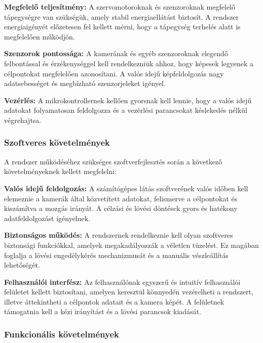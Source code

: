 \documentclass[12pt,a4paper]{article}
\begin{document}
\begin{list}{}{}
	\item \textbf{Megfelelő teljesítmény:}  A szervomotoroknak és szenzoroknak megfelelő tápegységre van szükségük, amely stabil energiaellátást biztosít. A rendszer energiaigényét előzetesen fel kellett mérni, hogy a tápegység terhelés alatt is megfelelően működjön.
	\item \textbf{Szenzorok pontossága:} A kamerának és egyéb szenzoroknak elegendő felbontással és érzékenységgel kell rendelkezniük ahhoz, hogy képesek legyenek a célpontokat megfelelően azonosítani. A valós idejű képfeldolgozás nagy adatsebességet és megbízható szenzorjeleket igényel.
	\item\textbf{ Vezérlés:} A mikrokontrollernek kellően gyorsnak kell lennie, hogy a valós idejű adatokat folyamatosan feldolgozza és a vezérlési parancsokat késlekedés nélkül végrehajtsa.
\end{list}


\subsubsection*{Szoftveres követelmények}

A rendszer működéséhez szükséges szoftverfejlesztés során a következő követelményeknek kellett megfelelni:

\begin{list}{}{}
	\item \textbf{Valós idejű feldolgozás:}  A számítógépes látás szoftverének valós időben kell elemeznie a kamerák által közvetített adatokat, felismerve a célpontokat és kiszámítva a mozgás irányát. A célzási és lövési döntések gyors és hatékony adatfeldolgozást igényelnek.
	\item \textbf{Biztonságos működés:} A rendszernek rendelkeznie kell olyan szoftveres biztonsági funkciókkal, amelyek megakadályozzák a véletlen tüzelést. Ez magában foglalja a lövési engedélykérés mechanizmusát és a manuális vészleállítás lehetőségét.
	\item \textbf{Felhasználói interfész:} Az felhasználónak egyszerű és intuitív felhasználói felületet kellett biztosítani, amelyen keresztül könnyedén vezérelheti a rendszert, illetve áttekintheti a célpontok adatait és a kamera képét. A felületnek támogatnia kell a kézi irányítást és a lövési parancsok kiadását.
\end{list}



 
\subsubsection*{Funkcionális követelmények}
\end{document}
